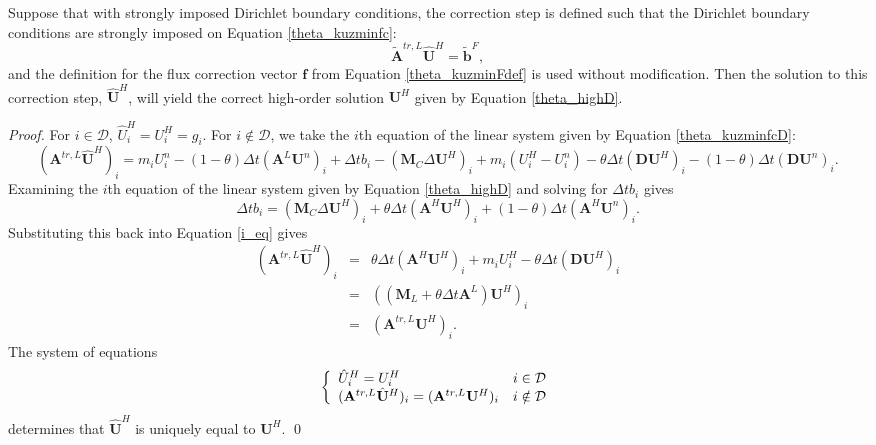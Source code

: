 \begin{lemma}
   Suppose that with strongly imposed Dirichlet boundary conditions, the
   correction step is defined such that the Dirichlet boundary conditions
   are strongly imposed on Equation \ref{theta_kuzminfc}:
   \begin{equation}\label{theta_kuzminfcD}
      \tilde{\mathbf{A}}^{tr,L}\hat{\mathbf{U}}^H
         = \tilde{\mathbf{b}}^F,
   \end{equation}
   and the definition for
   the flux correction vector $\mathbf{f}$ from
   Equation \ref{theta_kuzminFdef} is used without modification. Then the solution
   to this correction step, $\hat{\mathbf{U}}^H$, will yield the
   correct high-order solution $\mathbf{U}^H$ given by Equation \ref{theta_highD}.
\end{lemma}
\begin{proof}
   For $i\in\mathcal{D}$, $\hat{U}^H_i = U^H_i = g_i$. For $i\notin\mathcal{D}$,
   we take the $i$th equation of the linear system given by Equation \ref{theta_kuzminfcD}:
   \begin{equation}\label{i_eq}
      (\mathbf{A}^{tr,L}\hat{\mathbf{U}}^H)_i
         = m_i U^n_i - (1-\theta)\Delta t(\mathbf{A}^L\mathbf{U}^n)_i
         + \Delta t b_i - (\mathbf{M}_C\Delta\mathbf{U}^H)_i
         + m_i(U^H_i-U^n_i) - \theta\Delta t(\mathbf{D}\mathbf{U}^H)_i
         - (1-\theta)\Delta t(\mathbf{D}\mathbf{U}^n)_i.
   \end{equation}
   Examining the $i$th equation of the linear system given by Equation \ref{theta_highD}
   and solving for $\Delta t b_i$ gives
   \begin{equation}
      \Delta t b_i = (\mathbf{M}_C\Delta\mathbf{U}^H)_i
         + \theta\Delta t(\mathbf{A}^H\mathbf{U}^H)_i
         + (1-\theta)\Delta t(\mathbf{A}^H\mathbf{U}^n)_i.
   \end{equation}
   Substituting this back into Equation \ref{i_eq} gives
   \begin{eqnarray}
      (\mathbf{A}^{tr,L}\hat{\mathbf{U}}^H)_i
         & = & \theta\Delta t(\mathbf{A}^H\mathbf{U}^H)_i
         + m_i U^H_i - \theta\Delta t(\mathbf{D}\mathbf{U}^H)_i\\
         & = & \left((\mathbf{M}_L+\theta\Delta t\mathbf{A}^L)\mathbf{U}^H\right)_i\\
         & = &(\mathbf{A}^{tr,L}\mathbf{U}^H)_i.
   \end{eqnarray}
   The system of equations
   \begin{equation}
      \left\{
         \begin{array}{l l}
            \hat{U}^H_i = U^H_i & i\in\mathcal{D}\\
            (\mathbf{A}^{tr,L}\hat{\mathbf{U}}^H)_i = (\mathbf{A}^{tr,L}\mathbf{U}^H)_i
               & i\notin\mathcal{D}
         \end{array}
      \right.
   \end{equation}
   determines that $\hat{\mathbf{U}}^H$ is uniquely equal to $\mathbf{U}^H$.
   \qed
\end{proof}
